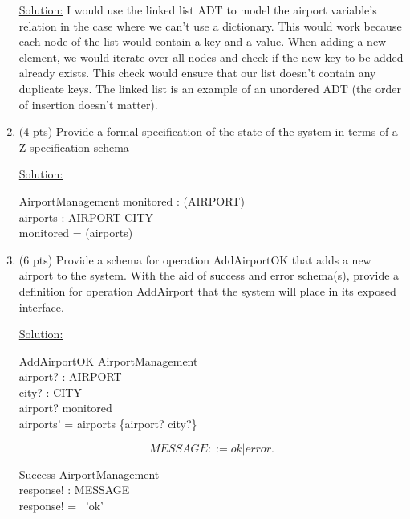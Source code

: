 \documentclass[12pt]{article}
\begin{document}
\begin{spacing}{1.5}
\begin{enumerate}
		      \underline{Solution:}
		      I would use the linked list ADT to model the airport variable's relation in the case where we can't use a dictionary. This would work because each node of the list would contain a key and a value. When adding a new element, we would iterate over all nodes and check if the new key to be added already exists. This check would ensure that our list doesn't contain any duplicate keys. The linked list is an example of an unordered ADT (the order of insertion doesn't matter).
		      
		\item (4 pts) Provide a formal specification of the state of the system in terms of a Z specification schema
		              
		      \underline{Solution:}
		      \begin{schema}{AirportManagement}
		      	monitored : (AIRPORT) \\
		      	airports : AIRPORT \pfun CITY \\
		      	\where
		      	monitored = (airports) 
		      \end{schema}
		      
		\item (6 pts) Provide a schema for operation AddAirportOK that adds a new airport to the
		      system. With the aid of success and error schema(s), provide a definition for operation
		      AddAirport that the system will place in its exposed interface.
		              
		      \underline{Solution:}
		      \begin{schema}{AddAirportOK}
		      	\Delta AirportManagement \\
		      	airport? : AIRPORT \\
		      	city? : CITY \\
		      	\where
		      	airport? \notin monitored \\
		      	airports' = airports \cup \{airport? \mapsto city?\} \\
		      \end{schema}
		      $$MESSAGE ::= ok | error.$$
		      
		      \begin{schema}{Success}
		      	\Xi AirportManagement \\
		      	response! : MESSAGE \\
		      	\where
		      	response! = \, 'ok' \\
		      \end{schema}
		      

\end{enumerate}
\end{spacing}
\end{document}
